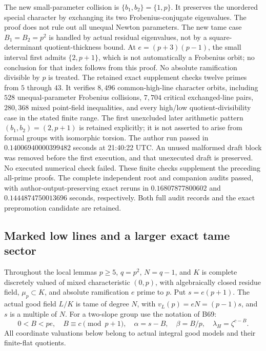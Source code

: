\begin{remark}
\label{rem:B-RD70-scope}
The new small-parameter collision is \(\{b_1,b_2\}=\{1,p\}\).
It preserves the unordered special character by exchanging its
two Frobenius-conjugate eigenvalues. The proof does not rule out
all unequal Newton parameters.
The new tame case \(B_1=B_2=p^2\) is handled by actual residual
eigenvalues, not by a square-determinant quotient-thickness bound.
At \(e=(p+3)(p-1)\), the small interval first admits
\(\{2,p+1\}\), which is not automatically a Frobenius orbit;
no conclusion for that index follows from this proof.
No absolute ramification divisible by \(p\) is treated.
The retained exact supplement
checks twelve primes from \(5\) through \(43\).
It verifies \(8{,}496\) common-high-line character orbits,
including \(528\) unequal-parameter Frobenius collisions,
\(7{,}704\) critical exchanged-line pairs,
\(280{,}368\) mixed point-field inequalities, and every
high/low quotient-divisibility case in the stated finite range.
The first unexcluded later arithmetic pattern
\((b_1,b_2)=(2,p+1)\) is retained explicitly; it is not
asserted to arise from formal groups with isomorphic torsion.
The author run passed in \(0.14006940000399482\) seconds at
21:40:22 UTC. An unused malformed draft block was removed
before the first execution, and that unexecuted draft is
preserved. No executed numerical check failed.
These finite checks supplement the preceding all-prime proofs.
The complete independent root and companion audits passed,
with author-output-preserving exact reruns in
\(0.16807877800602\) and \(0.1444874750013696\) seconds,
respectively. Both full audit records and the exact
prepromotion candidate are retained.
\end{remark}


\subsection{Marked low lines and a larger exact tame sector}

Throughout the local lemmas \(p\ge5\), \(q=p^2\), \(N=q-1\),
and \(K\) is complete discretely valued of mixed characteristic
\((0,p)\), with algebraically closed residue field, \(\mu_p\subset K\),
and absolute ramification \(e\) prime to \(p\). Put \(s=e(p+1)\).
The actual good field \(L/K\) is tame of degree \(N\), with
\(v_L(p)=eN=(p-1)s\), and \(s\) is a multiple of \(N\).
For a two-slope group use the notation of B69:
\[
 0<B<pe,\quad B\equiv c\pmod{p+1},\quad
 \alpha=s-B,\quad\beta=B/p,\quad
 \lambda_H=\zeta^{c-B}.
 \tag{B-RD71.1}
\]
All coordinate valuations below belong to actual integral good
models and their finite-flat quotients.

